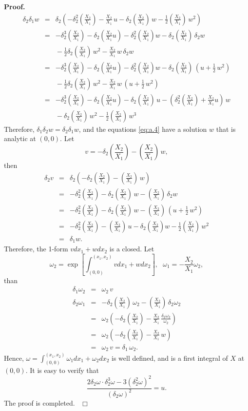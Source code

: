 \documentclass[preprint, 12pt]{elsarticle}
\numberwithin{equation}{section}
\newenvironment{proof}[1][Proof]{\textbf{#1.}\ }{\ $\Box$}
\begin{document}
\begin{proof}
\begin{eqnarray*}
\delta_2\delta_1w&=&\delta_2\left(-\delta_2^2(\frac{X_2}{X_1})-\frac{X_2}{X_1}\,u
- \delta_2(\frac{X_2}{X_1})\,w -
\frac{1}{2}(\frac{X_2}{X_1})\,w^2\right)\\
&=&-\delta_2^3(\frac{X_2}{X_1}) - \delta_2(\frac{X_2}{X_1}u) -
\delta_2^2(\frac{X_2}{X_1})w -
\delta_2(\frac{X_2}{X_1})\,\delta_2w\\
&&{} -
\frac{1}{2}\delta_2(\frac{X_2}{X_1})\,w^2 -
\frac{X_2}{X_1}\,w\,\delta_2w\\
&=&-\delta_2^3(\frac{X_2}{X_1}) - \delta_2(\frac{X_2}{X_1}u) -
\delta_2^2(\frac{X_2}{X_1})w - \delta_2(\frac{X_2}{X_1})\,(u +
\frac{1}{2}\,w^2)\\
&&{} - \frac{1}{2}\delta_2(\frac{X_2}{X_1})\,w^2 -
\frac{X_2}{X_1}\,w\,(u + \frac{1}{2}\,w^2)\\
&=&-\delta_2^3(\frac{X_2}{X_1}) -
\delta_2(\frac{X_2}{X_1}u)-\delta_2(\frac{X_2}{X_1})\,u -
\left(\delta_2^2(\frac{X_2}{X_1}) + \frac{X_2}{X_1}u\right)\,w\\
&&{} -
\delta_2(\frac{X_2}{X_1})\,w^2 - \frac{1}{2}(\frac{X_2}{X_1})\,w^3
\end{eqnarray*}
Therefore, $\delta_1\delta_2w = \delta_2\delta_1w$, and the
equations \eqref{eq:a.4} have a solution $w$ that is analytic at
$(0,0)$. Let
$$v = -\delta_2(\frac{X_2}{X_1}) - (\frac{X_2}{X_1})\,w, $$
then
\begin{eqnarray*}
\delta_2v&=&\delta_2(-\delta_2(\frac{X_2}{X_1}) -
(\frac{X_2}{X_1})\,w)\\
&=&-\delta_2^2(\frac{X_2}{X_1}) -
\delta_2(\frac{X_2}{X_1})\,w - (\frac{X_2}{X_1})\,\delta_2w\\
&=&-\delta_2^2(\frac{X_2}{X_1}) -
\delta_2(\frac{X_2}{X_1})\,w - (\frac{X_2}{X_1})\,(u + \frac{1}{2}\,w^2)\\
&=&-\delta_2^2(\frac{X_2}{X_1}) - (\frac{X_2}{X_1})\,u -
\delta_2(\frac{X_2}{X_1})w - \frac{1}{2}(\frac{X_2}{X_1})\,w^2\\
&=&\delta_1w.
\end{eqnarray*}
Therefore, the 1-form $v dx_1 + w dx_2$ is a closed. Let
$$\omega_2 =
\exp\left[\int_{(0,0)}^{(x_1,x_2)} v dx_1 + w dx_2\right],\ \ \
\omega_1 = -\frac{X_2}{X_1}\omega_2,$$ than
\begin{eqnarray*}
\delta_1\omega_2&=&\omega_2\,v\\
\delta_2\omega_1&=&-\delta_2(\frac{X_2}{X_1})\,\omega_2 -
(\frac{X_2}{X_1})\,\delta_2\omega_2\\
&=&\omega_2(-\delta_2(\frac{X_2}{X_1}) -
\frac{X_2}{X_1}\,\frac{\delta_2\omega_2}{\omega_2})\\
&=&\omega_2(-\delta_2(\frac{X_2}{X_1}) - \frac{X_2}{X_1}\,w)\\
&=&\omega_2\,v = \delta_1\,\omega_2.
\end{eqnarray*}
Hence, $\omega = \int_{(0,0)}^{(x_1,x_2)} \omega_1 dx_1 + \omega_2
dx_2$ is well defined, and is a first integral of $X$ at $(0,0)$.
It is easy to verify that
$$\dfrac{2\delta_2\omega\cdot\delta_2^3\omega - 3(\delta_2^2\omega)^2}{(\delta_2\omega)^2} = u.$$
The proof is completed.
\end{proof}
\end{document}
